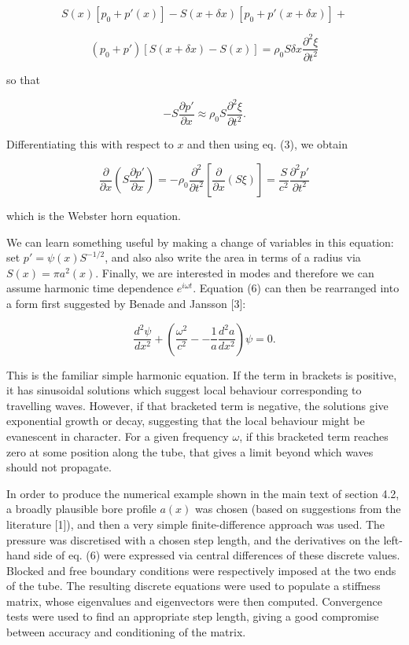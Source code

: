   $$S(x) [p_0+p'(x)] -S(x+ \delta x) [p_0+p'(x+ \delta x)] + $$ 

  $$(p_0 +p') [S(x+ \delta x) -S(x)]= \rho_0 S \delta x \frac{\partial^2 
  \xi}{\partial t^2} \tag{4}$$ 

  so that 

  $$- S\frac{\partial p'}{\partial x} \approx \rho_0 S \frac{\partial^2 
  \xi}{\partial t^2} .\tag{5}$$ 

  Differentiating this with respect to $x$ and then using eq. (3), we obtain 

  $$\dfrac{\partial}{\partial x} \left( S\frac{\partial p'}{\partial x} \right) 
  = -\rho_0 \frac{\partial^2}{\partial t^2} \left[ \frac{\partial }{\partial x} 
  (S \xi) \right]= \dfrac{S}{c^2} \frac{\partial^2 p'}{\partial t^2} \tag{6}$$ 

  which is the Webster horn equation. 

  We can learn something useful by making a change of variables in this 
  equation: set $p'=\psi(x) S^{-1/2}$, and also also write the area in terms of 
  a radius via $S(x)=\pi a^2(x)$. Finally, we are interested in modes and 
  therefore we can assume harmonic time dependence $e^{i \omega t}$. Equation 
  (6) can then be rearranged into a form first suggested by Benade and Jansson 
  [3]: 

  $$\dfrac{d^2 \psi}{dx^2} + \left( \frac{\omega^2}{c^2} -- \frac{1}{a} 
  \dfrac{d^2a}{dx^2} \right) \psi = 0. \tag{7}$$ 

  This is the familiar simple harmonic equation. If the term in brackets is 
  positive, it has sinusoidal solutions which suggest local behaviour 
  corresponding to travelling waves. However, if that bracketed term is 
  negative, the solutions give exponential growth or decay, suggesting that the 
  local behaviour might be evanescent in character. For a given frequency 
  $\omega$, if this bracketed term reaches zero at some position along the 
  tube, that gives a limit beyond which waves should not propagate. 

  In order to produce the numerical example shown in the main text of section 
  4.2, a broadly plausible bore profile $a(x)$ was chosen (based on suggestions 
  from the literature [1]), and then a very simple finite-difference approach 
  was used. The pressure was discretised with a chosen step length, and the 
  derivatives on the left-hand side of eq. (6) were expressed via central 
  differences of these discrete values. Blocked and free boundary conditions 
  were respectively imposed at the two ends of the tube. The resulting discrete 
  equations were used to populate a stiffness matrix, whose eigenvalues and 
  eigenvectors were then computed. Convergence tests were used to find an 
  appropriate step length, giving a good compromise between accuracy and 
  conditioning of the matrix. 

